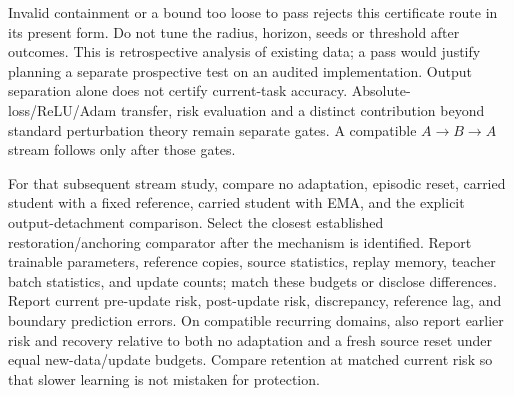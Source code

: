 \documentclass[11pt,a4paper]{article}
\begin{document}
Invalid containment or a bound too loose to pass rejects this certificate
route in its present form. Do not tune the radius, horizon, seeds or
threshold after outcomes. This is retrospective analysis of existing data;
a pass would justify planning a separate prospective test on an audited
implementation. Output separation alone does not certify current-task
accuracy. Absolute-loss/ReLU/Adam transfer, risk evaluation and a distinct
contribution beyond standard perturbation theory remain separate gates.
A compatible $A\to B\to A$ stream follows only after those gates.

For that subsequent stream study, compare no adaptation, episodic reset,
carried student with a fixed
reference, carried student with EMA, and the explicit output-detachment
comparison. Select the closest established restoration/anchoring comparator
after the mechanism is identified. Report trainable parameters, reference
copies, source statistics, replay memory, teacher batch statistics, and
update counts; match these budgets or disclose differences. Report current
pre-update risk, post-update risk, discrepancy, reference lag, and boundary
prediction errors. On compatible recurring domains, also report earlier
risk and recovery relative to both no adaptation and a fresh source reset
under equal new-data/update budgets. Compare retention at matched current
risk so that slower learning is not mistaken for protection.
\end{document}
